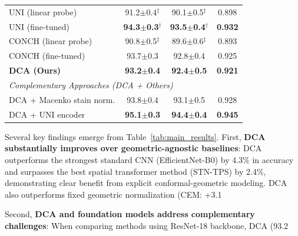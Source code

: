 \documentclass[final,3p,times,review,sort&compress]{elsarticle}
\begin{document}
\begin{table}[t]
\begin{tabularx}{\textwidth}{Xccc}
UNI (linear probe) & 91.2$\pm$0.4$^\ddagger$ & 90.1$\pm$0.5$^\ddagger$ & 0.898 \\
UNI (fine-tuned) & \textbf{94.3$\pm$0.3}$^\dagger$ & \textbf{93.5$\pm$0.4}$^\dagger$ & \textbf{0.932} \\
CONCH (linear probe) & 90.8$\pm$0.5$^\ddagger$ & 89.6$\pm$0.6$^\ddagger$ & 0.893 \\
CONCH (fine-tuned) & 93.7$\pm$0.3 & 92.8$\pm$0.4 & 0.925 \\
\hline
\textbf{DCA (Ours)} & \textbf{93.2$\pm$0.4} & \textbf{92.4$\pm$0.5} & \textbf{0.921} \\
\hline
\multicolumn{4}{l}{\textit{Complementary Approaches (DCA + Others)}} \\
DCA + Macenko stain norm. & 93.8$\pm$0.4 & 93.1$\pm$0.5 & 0.928 \\
DCA + UNI encoder & \textbf{95.1$\pm$0.3} & \textbf{94.4$\pm$0.4} & \textbf{0.945} \\
\hline
\end{tabularx}
\end{table}

Several key findings emerge from Table~\ref{tab:main_results}. First, \textbf{DCA substantially improves over geometric-agnostic baselines}: DCA outperforms the strongest standard CNN (EfficientNet-B0) by 4.3\% in accuracy and surpasses the best spatial transformer method (STN-TPS) by 2.4\%, demonstrating clear benefit from explicit conformal-geometric modeling. DCA also outperforms fixed geometric normalization (CEM: +3.1%

Second, \textbf{DCA and foundation models address complementary challenges}: When comparing methods using ResNet-18 backbone, DCA (93.2%
\end{document}
